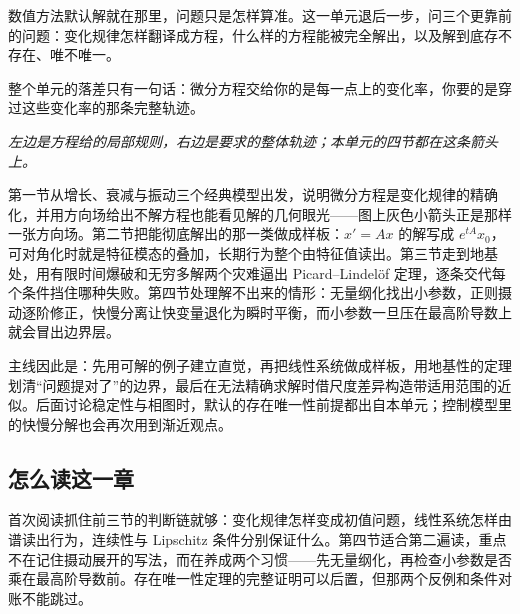 数值方法默认解就在那里，问题只是怎样算准。这一单元退后一步，问三个更靠前的问题：变化规律怎样翻译成方程，什么样的方程能被完全解出，以及解到底存不存在、唯不唯一。

整个单元的落差只有一句话：微分方程交给你的是每一点上的变化率，你要的是穿过这些变化率的那条完整轨迹。

\begin{center}
\end{center}

\emph{左边是方程给的局部规则，右边是要求的整体轨迹；本单元的四节都在这条箭头上。}

第一节从增长、衰减与振动三个经典模型出发，说明微分方程是变化规律的精确化，并用方向场给出不解方程也能看见解的几何眼光——图上灰色小箭头正是那样一张方向场。第二节把能彻底解出的那一类做成样板：\(x'=Ax\) 的解写成 \(e^{tA}x_0\)，可对角化时就是特征模态的叠加，长期行为整个由特征值读出。第三节走到地基处，用有限时间爆破和无穷多解两个灾难逼出 Picard--Lindelöf 定理，逐条交代每个条件挡住哪种失败。第四节处理解不出来的情形：无量纲化找出小参数，正则摄动逐阶修正，快慢分离让快变量退化为瞬时平衡，而小参数一旦压在最高阶导数上就会冒出边界层。

主线因此是：先用可解的例子建立直觉，再把线性系统做成样板，用地基性的定理划清``问题提对了''的边界，最后在无法精确求解时借尺度差异构造带适用范围的近似。后面讨论稳定性与相图时，默认的存在唯一性前提都出自本单元；控制模型里的快慢分解也会再次用到渐近观点。

\subsection{怎么读这一章}

首次阅读抓住前三节的判断链就够：变化规律怎样变成初值问题，线性系统怎样由谱读出行为，连续性与 Lipschitz 条件分别保证什么。第四节适合第二遍读，重点不在记住摄动展开的写法，而在养成两个习惯——先无量纲化，再检查小参数是否乘在最高阶导数前。存在唯一性定理的完整证明可以后置，但那两个反例和条件对账不能跳过。

